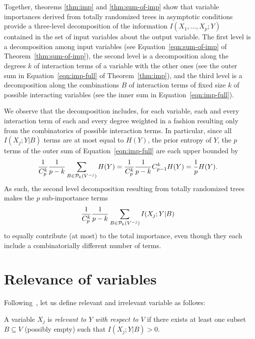 Together, theorems \ref{thm:imp} and \ref{thm:sum-of-imp} show that  variable
importances derived from totally randomized trees in asymptotic conditions
provide a three-level decomposition of the information $I(X_{1}, \ldots, X_{p}
; Y)$ contained in the set of input variables about the output variable. The
first level is a decomposition among input variables (see Equation~\ref{eqn:sum-of-imp}
of Theorem~\ref{thm:sum-of-imp}),  the second level is a
decomposition along the degrees $k$ of interaction terms of a variable with the
other ones (see the outer sum in Equation~\ref{eqn:imp-full} of
Theorem~\ref{thm:imp}), and the third level is a decomposition along the
combinations $B$ of interaction terms of fixed size $k$ of possible interacting
variables (see the inner sum in Equation~\ref{eqn:imp-full}).

We observe that the decomposition includes, for each variable, each and every
interaction term of each and every degree weighted in a fashion resulting only
from the combinatorics of possible interaction terms. In particular, since all
$I(X_j;Y|B)$ terms are at most equal to $H(Y)$, the prior entropy of $Y$,  the
$p$ terms of the outer sum of Equation~\ref{eqn:imp-full} are each upper
bounded by
\begin{equation}
\frac{1}{C^k_p}\frac{1}{p-k}\sum_{B \in {\cal P}_k(V^{-j})}
H(Y)=\frac{1}{C^k_p} \frac{1}{p-k} {C^k_{p-1}} H(Y) = \frac{1}{p}H(Y).
\end{equation}
As such,
the second level decomposition resulting from totally randomized trees makes the
$p$ sub-importance terms
\begin{equation}
\frac{1}{C^k_p} \frac{1}{p-k} \sum_{B \in {\cal P}_k(V^{-j})} I(X_j;Y|B)
\end{equation}
to equally contribute (at most) to the total
importance, even though they each include a combinatorially different number of
terms.


\section{Relevance of variables}
\label{sec:6:variable-relevance}

Following~\citet{kohavi:1997}, let us define relevant and irrelevant variable as follows:

\begin{definition}
A variable $X_j$ is {\em relevant to $Y$ with
respect to $V$} if there exists at least one subset $B
\subseteq V$ (possibly empty) such that $I(X_j;Y|B)>0$.
\end{definition}

